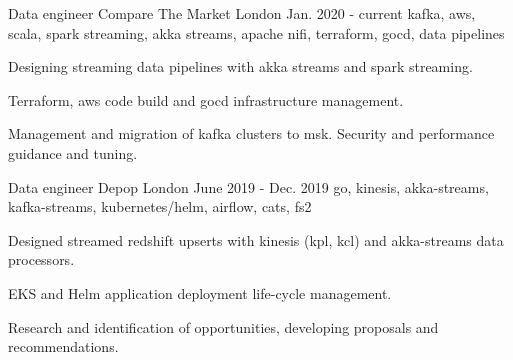 
\newcommand*{\logo}[2]{\raisebox{-0.2em}{\texttt{[image: \#2]}}\hspace{0.25em}#1}

\begin{cventries}

  \cventry
    {Data engineer} %
    {\logo{\ctm Compare The Market}{../../../images/ctm.png}} %
    {London} %
    {Jan. 2020 - current} %
    {kafka, aws, scala, spark streaming, akka streams, apache nifi, terraform, gocd, data pipelines} %
    {
      \begin{cvitems} %
        \item {Designing streaming data pipelines with akka streams and spark streaming.}
        \item {Terraform, aws code build and gocd infrastructure management.}
        \item {Management and migration of kafka clusters to msk. Security and performance guidance and tuning. }
      \end{cvitems}
    }

  \cventry
    {Data engineer} %
    {\logo{\depop Depop}{../../../images/depop.jpg}} %
    {London} %
    {June 2019 - Dec. 2019} %
    {go, kinesis, akka-streams, kafka-streams, kubernetes/helm, airflow, cats, fs2} %
    {
      \begin{cvitems} %
        \item {Designed streamed redshift upserts with kinesis (kpl, kcl) and akka-streams data processors.}
        \item {EKS and Helm application deployment life-cycle management.}
        \item {Research and identification of opportunities, developing proposals and recommendations.}
      \end{cvitems}
    }


\end{cventries}
